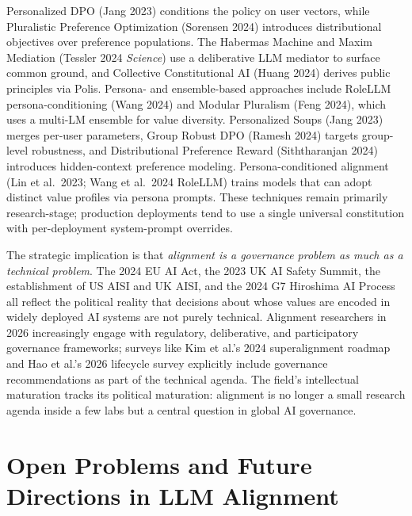 Personalized DPO (Jang 2023) conditions the policy on user vectors, while Pluralistic Preference Optimization (Sorensen 2024) introduces distributional objectives over preference populations. The Habermas Machine and Maxim Mediation (Tessler 2024 \emph{Science}) use a deliberative LLM mediator to surface common ground, and Collective Constitutional AI (Huang 2024) derives public principles via Polis. Persona- and ensemble-based approaches include RoleLLM persona-conditioning (Wang 2024) and Modular Pluralism (Feng 2024), which uses a multi-LM ensemble for value diversity. Personalized Soups (Jang 2023) merges per-user parameters, Group Robust DPO (Ramesh 2024) targets group-level robustness, and Distributional Preference Reward (Siththaranjan 2024) introduces hidden-context preference modeling. Persona-conditioned alignment (Lin et al.~2023; Wang et al.~2024 RoleLLM) trains models that can adopt distinct value profiles via persona prompts. These techniques remain primarily research-stage; production deployments tend to use a single universal constitution with per-deployment system-prompt overrides.

The strategic implication is that \emph{alignment is a governance problem as much as a technical problem}. The 2024 EU AI Act, the 2023 UK AI Safety Summit, the establishment of US AISI and UK AISI, and the 2024 G7 Hiroshima AI Process all reflect the political reality that decisions about whose values are encoded in widely deployed AI systems are not purely technical. Alignment researchers in 2026 increasingly engage with regulatory, deliberative, and participatory governance frameworks; surveys like Kim et al.'s 2024 superalignment roadmap and Hao et al.'s 2026 lifecycle survey explicitly include governance recommendations as part of the technical agenda. The field's intellectual maturation tracks its political maturation: alignment is no longer a small research agenda inside a few labs but a central question in global AI governance.

\section{Open Problems and Future Directions in LLM Alignment}\label{open-problems-and-future-directions-in-llm-alignment}

